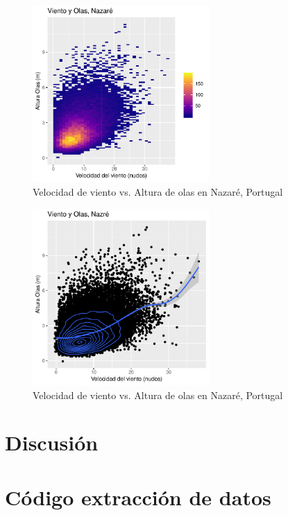 \begin{figure}[H]
\label{fig:wind_waves_nazare}
\centering
\includegraphics[width=0.6\textwidth]{./figures/nazare_bin2d.pdf}
  \caption{Velocidad de viento vs. Altura de olas en Nazaré, Portugal}
\end{figure}

\begin{figure}[H]
\label{fig:nazare_smooth}
\centering
\includegraphics[width=0.6\textwidth]{./figures/nazare_smooth.pdf}
  \caption{Velocidad de viento vs. Altura de olas en Nazaré, Portugal}
\end{figure}

\section{Discusión}%
\label{sec:discusión}

\pagebreak
\appendix

\section{Código extracción de datos}%
\label{sec:codigo_extraccion_de_datos}




